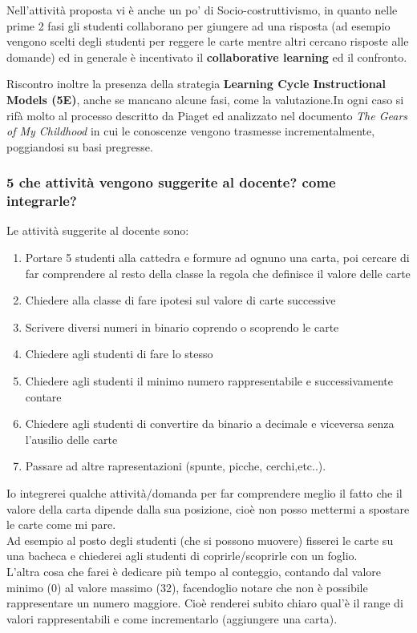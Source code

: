 \documentclass[a4paper]{article}
\begin{document}
Nell'attività proposta vi è anche un po' di Socio-costruttivismo, in quanto nelle prime 2 fasi gli studenti collaborano per giungere ad una risposta (ad esempio vengono scelti degli studenti per reggere le carte mentre altri cercano risposte alle domande) ed in generale è incentivato il \textbf{collaborative learning} ed il confronto.

Riscontro inoltre la presenza della strategia \textbf{Learning Cycle Instructional Models (5E)}, anche se mancano alcune fasi, come la valutazione.In ogni caso si rifà molto al processo descritto da Piaget ed analizzato nel documento \emph{The Gears of My Childhood} \cite{gears} in cui le conoscenze vengono trasmesse incrementalmente, poggiandosi su basi pregresse.

\subsubsection{5 che attività vengono suggerite al docente? come integrarle?}
Le attività suggerite al docente sono:
\begin{enumerate}
	\item Portare 5 studenti alla cattedra e formure ad ognuno una carta, poi cercare di far comprendere al resto della classe la regola che definisce il valore delle carte
	\item Chiedere alla classe di fare ipotesi sul valore di carte successive
	\item Scrivere diversi numeri in binario coprendo o scoprendo le carte
	\item Chiedere agli studenti di fare lo stesso
	\item Chiedere agli studenti il minimo numero rappresentabile e successivamente contare
	\item Chiedere agli studenti di convertire da binario a decimale e viceversa senza l'ausilio delle carte
	\item Passare ad altre rapresentazioni (spunte, picche, cerchi,etc..).
\end{enumerate}
Io integrerei qualche attività/domanda per far comprendere meglio il fatto che il valore della carta dipende dalla sua posizione, cioè non posso mettermi a spostare le carte come mi pare.\\
Ad esempio al posto degli studenti (che si possono muovere) fisserei le carte su una bacheca e chiederei agli studenti di coprirle/scoprirle con un foglio.\\

L'altra cosa che farei è dedicare più tempo al conteggio, contando dal valore minimo (0) al valore massimo (32), facendoglio notare che non è possibile rappresentare un numero maggiore. Cioè renderei subito chiaro qual'è il range di valori rappresentabili e come incrementarlo (aggiungere una carta).
\end{document}
